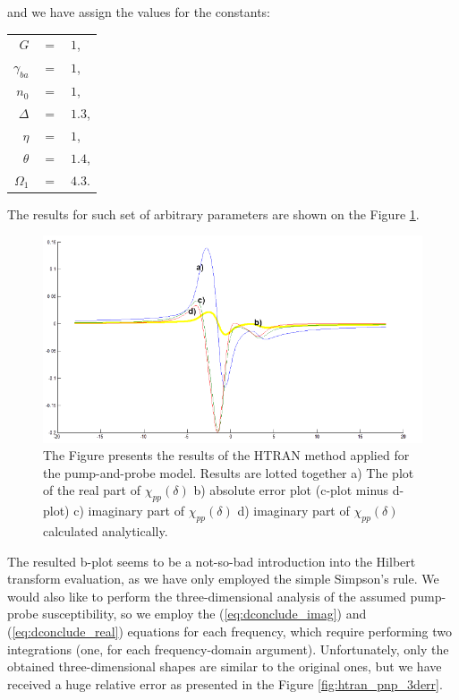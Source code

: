 \documentclass[12pt,twoside,a4paper]{article}
\numberwithin{equation}{subsection}
\numberwithin{figure}{subsection}
\begin{document}
and we have assign the values for the constants:
\begin{tabular}{r r l}
  $G$           & $=$ & $1$, \\
  $\gamma_{ba}$ & $=$ & $1$, \\
  $n_0$         & $=$ & $1$, \\
  $\Delta$      & $=$ & $1.3$, \\
  $\eta$        & $=$ & $1$, \\
  $\theta$      & $=$ & $1.4$, \\
  $\Omega_{1}$  & $=$ & $4.3$. \\
\end{tabular}

The results for such set of arbitrary parameters are shown on the Figure \ref{fig:htran_pnp_2d}.

\begin{figure}
  \includegraphics[width=150mm]{img/htran_pnp_2d.png}
  \caption{The Figure presents the results of the HTRAN method applied for the pump-and-probe model. Results are lotted together
    a) The plot of the real part of $\chi_{pp} (\delta )$ 
    b) absolute error plot (c-plot minus d-plot) 
    c) imaginary part of $\chi_{pp} (\delta )$
    d) imaginary part of ${\chi_{pp}}(\delta )$ calculated analytically.
    \label{fig:htran_pnp_2d}}
\end{figure}

The resulted b-plot seems to be a not-so-bad introduction into the Hilbert transform evaluation, as we have only employed the
simple Simpson's rule. We would also like to perform the three-dimensional analysis of the assumed pump-probe susceptibility, so we
employ the (\ref{eq:dconclude_imag}) and (\ref{eq:dconclude_real}) equations for each frequency, which require performing two
integrations (one, for each frequency-domain argument). Unfortunately, only the obtained three-dimensional shapes are similar to the original ones, but we have received a huge relative
error as presented in the Figure \ref{fig:htran_pnp_3derr}.
\end{document}

